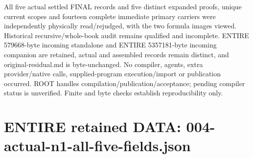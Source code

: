 \documentclass[11pt]{article}
\begin{document}
All five actual settled FINAL records and five distinct expanded proofs, unique current scopes and fourteen complete immediate primary carriers were independently physically read/rejudged, with the two formula images viewed. Historical recursive/whole-book audit remains qualified and incomplete. ENTIRE 579668-byte incoming standalone and ENTIRE 5357181-byte incoming companion are retained, actual and assembled records remain distinct, and original-residual.md is byte-unchanged. No compiler, agents, extra provider/native calls, supplied-program execution/import or publication occurred. ROOT handles compilation/publication/acceptance; pending compiler status is unverified. Finite and byte checks establish reproducibility only.

\appendix
\section{ENTIRE retained DATA: 004-actual-n1-all-five-fields.json}
\end{document}
